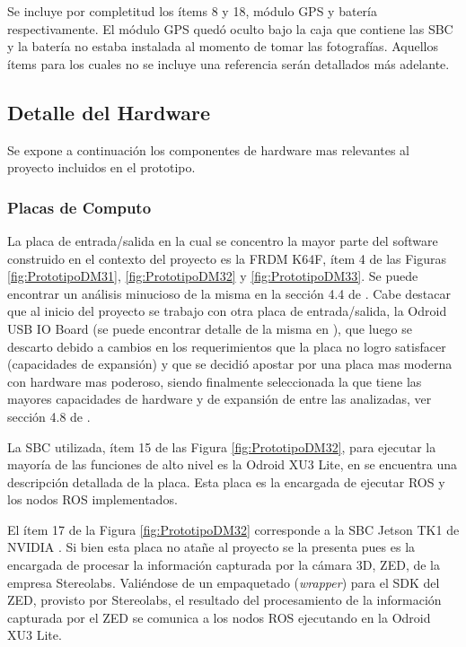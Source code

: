 \documentclass[withindex,glossary]{cam-thesis}
\begin{document}
Se incluye por completitud los ítems 8 y 18, módulo GPS y batería respectivamente. El módulo GPS quedó oculto bajo la caja que contiene las SBC y la batería no estaba instalada al momento de tomar las fotografías. Aquellos ítems para los cuales no se incluye una referencia serán detallados más adelante.

\subsection{Detalle del Hardware} \label{sec: Implementación :: Plataforma Utilizada - Hardware}
Se expone a continuación los componentes de hardware mas relevantes al proyecto incluidos en el prototipo.

\subsubsection{Placas de Computo} 
La placa de entrada/salida en la cual se concentro la mayor parte del software construido en el contexto del proyecto es la FRDM K64F, ítem 4 de las Figuras \ref{fig:PrototipoDM31}, \ref{fig:PrototipoDM32} y \ref{fig:PrototipoDM33}. Se puede encontrar un análisis minucioso de la misma en la sección 4.4 de \cite{RASSOA}. Cabe destacar que al inicio del proyecto se trabajo con otra placa de entrada/salida, la Odroid USB IO Board (se puede encontrar detalle de la misma en \cite{RASSOA}), que luego se descarto debido a cambios en los requerimientos que la placa no logro satisfacer (capacidades de expansión) y que se decidió apostar por una placa mas moderna con hardware mas poderoso, siendo finalmente seleccionada la que tiene las mayores capacidades de hardware y de expansión de entre las analizadas, ver sección 4.8 de \cite{RASSOA}.

La SBC utilizada, ítem 15 de las Figura \ref{fig:PrototipoDM32}, para ejecutar la mayoría de las funciones de alto nivel es la Odroid XU3 Lite, en \cite{ODROIDXU3} se encuentra una descripción detallada de la placa. Esta placa es la encargada de ejecutar ROS y los nodos ROS implementados.

El ítem 17 de la Figura \ref{fig:PrototipoDM32} corresponde a la SBC Jetson TK1 de NVIDIA \cite{TegraTk1}. Si bien esta placa no atañe al proyecto se la presenta pues es la encargada de procesar la información capturada por la cámara 3D, ZED, de la empresa Stereolabs. Valiéndose de un empaquetado (\textit{wrapper}) para el SDK del ZED, provisto por Stereolabs, el resultado del procesamiento de la información capturada por el ZED se comunica a los nodos ROS ejecutando en la Odroid XU3 Lite.
\end{document}
